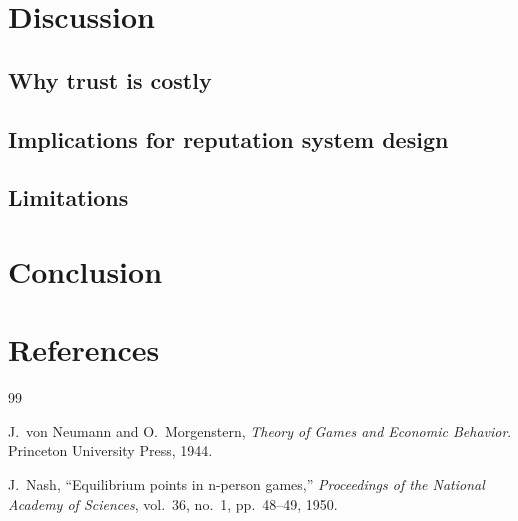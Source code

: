 \documentclass[11pt]{article}
\begin{document}
\section{Discussion}
\label{sec:discussion}

\subsection{Why trust is costly}

\subsection{Implications for reputation system design}

\subsection{Limitations}

\section{Conclusion}
\label{sec:conclusion}


\section*{References}
\label{sec:references}

\begin{thebibliography}{99}

J.~von Neumann and O.~Morgenstern,
\textit{Theory of Games and Economic Behavior}.
Princeton University Press, 1944.

J.~Nash, ``Equilibrium points in n-person games,''
\textit{Proceedings of the National Academy of Sciences},
vol.~36, no.~1, pp.~48--49, 1950.


\end{thebibliography}
\end{document}
